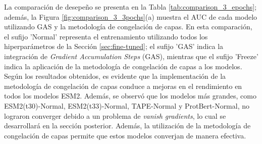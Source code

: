 La comparación de desepeño se presenta en la Tabla \ref{tab:comparison_3_epochs}; además, la Figura \ref{fig:comparison_3_3pochs}(a) muestra el AUC de cada modelo utilizando GAS y la metodología de congelación de capas. En esta comparación, el sufijo 'Normal' representa el entrenamiento  utilizando todos los hiperparámetros de la Sección \ref{sec:fine-tuned}; el sufijo 'GAS' indica la integración de \textit{Gradient Accumulation Steps} (GAS), mientras que el sufijo 'Freeze' indica la aplicación de la metodología de congelación de capas a los modelos. Según los resultados obtenidos, es evidente que la implementación de la metodología de congelación de capas conduce a mejoras en el rendimiento en todos los modelos ESM2. Además, se observó que los modelos más grandes, como ESM2(t30)-Normal, ESM2(t33)-Normal, TAPE-Normal y ProtBert-Normal, no lograron converger debido a un problema de \textit{vanish gradients}, lo cual se desarrollará en la sección posterior. Además, la utilización de la metodología de congelación de capas permite que estos modelos converjan de manera efectiva.

